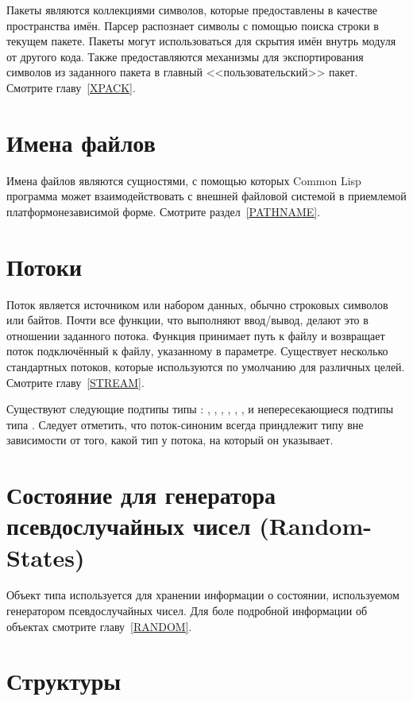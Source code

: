 Пакеты являются коллекциями символов, которые предоставлены в качестве
пространства имён. Парсер распознает символы с помощью поиска строки в текущем
пакете. Пакеты могут использоваться для скрытия имён внутрь модуля от другого
кода. Также предоставляются механизмы для экспортирования символов из заданного
пакета в главный <<пользовательский>> пакет.
Смотрите главу~\ref{XPACK}.

\section{Имена файлов}

Имена файлов являются сущностями, с помощью которых Common Lisp программа может
взаимодействовать с внешней файловой системой в приемлемой платформонезависимой
форме. Смотрите раздел~\ref{PATHNAME}.

\section{Потоки}

Поток является источником или набором данных, обычно строковых символов или
байтов. Почти все функции, что выполняют ввод/вывод, делают это в отношении
заданного потока. Функция  принимает путь к файлу и возвращает поток
подключённый к файлу, указанному в параметре.
Существует несколько стандартных потоков, которые используются по умолчанию для
различных целей. Смотрите главу~\ref{STREAM}.

Существуют следующие подтипы типы :
, ,
, , , ,
и  непересекающиеся подтипы типа .
Следует отметить, что поток-синоним всегда приндлежит типу 
вне зависимости от того, какой тип у потока, на который он указывает.

\section{Состояние для генератора псевдослучайных чисел (Random-States)}

Объект типа  используется для хранении информации о
состоянии, используемом генератором псевдослучайных чисел. Для боле подробной
информации об объектах  смотрите главу~\ref{RANDOM}.

\section{Структуры}

